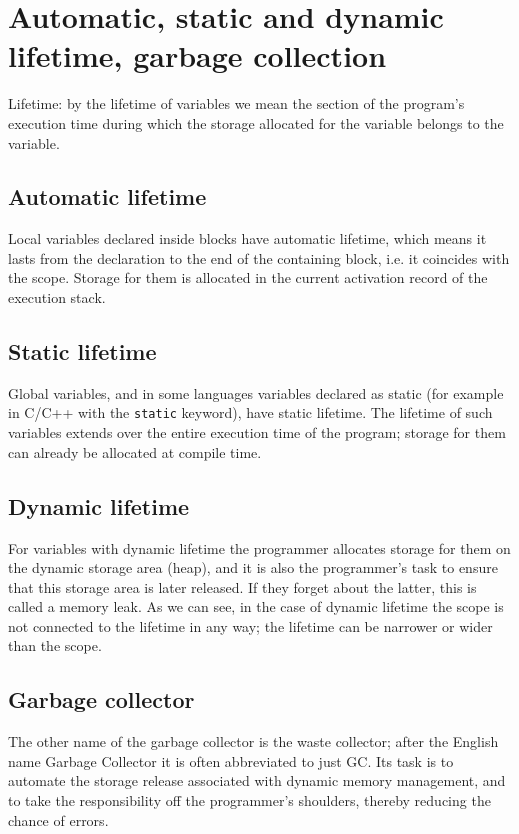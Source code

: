 \documentclass[margin=0px]{article}
\begin{document}
\section{Automatic, static and dynamic lifetime, garbage collection}
Lifetime: by the lifetime of variables we mean the section of the program's execution time during which the storage allocated for the variable belongs to the variable.

\subsection{Automatic lifetime}

Local variables declared inside blocks have automatic lifetime, which means it lasts from the declaration to the end of the containing block, i.e. it coincides with the scope. Storage for them is allocated in the current activation record of the execution stack.

\subsection{Static lifetime}

Global variables, and in some languages variables declared as static (for example in C/C++ with the \texttt{static} keyword), have static lifetime. The lifetime of such variables extends over the entire execution time of the program; storage for them can already be allocated at compile time.

\subsection{Dynamic lifetime}

For variables with dynamic lifetime the programmer allocates storage for them on the dynamic storage area (heap), and it is also the programmer's task to ensure that this storage area is later released. If they forget about the latter, this is called a memory leak.
As we can see, in the case of dynamic lifetime the scope is not connected to the lifetime in any way; the lifetime can be narrower or wider than the scope.

\subsection{Garbage collector}

The other name of the garbage collector is the waste collector; after the English name Garbage Collector it is often abbreviated to just GC. Its task is to automate the storage release associated with dynamic memory management, and to take the responsibility off the programmer's shoulders, thereby reducing the chance of errors.
\end{document}
